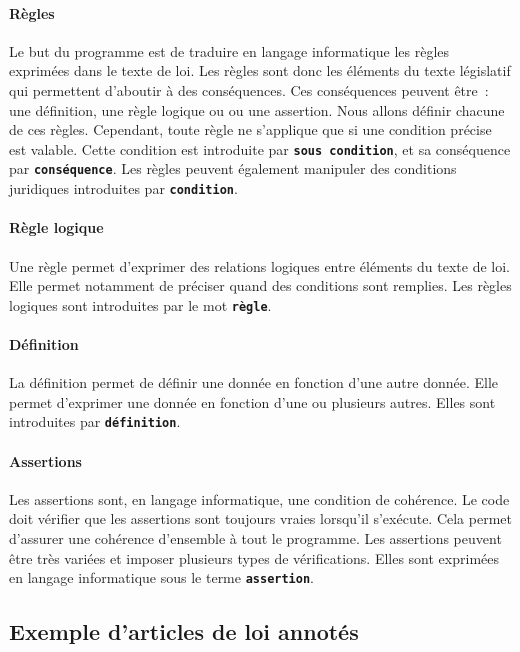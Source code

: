 \documentclass[12pt, french]{article}
\newcommand{\kw}[1]{\textbf{\textcolor{OliveGreen}{#1}}}
\newcommand{\inlinekw}[1]{\kw{\texttt{#1}}}
\begin{document}
\paragraph{Règles} Le but du programme est de traduire en langage informatique les règles exprimées dans le texte de loi. Les règles sont donc les éléments du texte législatif qui permettent d’aboutir à des conséquences. Ces conséquences peuvent être : une définition, une règle logique ou  ou une assertion. Nous allons définir chacune de ces règles. Cependant, toute règle ne s’applique que si une condition précise est valable. Cette condition est introduite par \inlinekw{sous condition}, et sa conséquence par \inlinekw{conséquence}. Les règles peuvent également manipuler des conditions juridiques introduites par \inlinekw{condition}.

\paragraph{Règle logique} Une règle permet d’exprimer des relations logiques entre éléments du texte de loi. Elle permet notamment de préciser quand des conditions sont remplies. Les règles logiques sont introduites par le mot \inlinekw{règle}.

\paragraph{Définition} La définition permet de définir une donnée en fonction d’une autre donnée. Elle permet d’exprimer une donnée en fonction d’une ou plusieurs autres. Elles sont introduites par \inlinekw{définition}.

\paragraph{Assertions} Les assertions sont, en langage informatique, une condition de cohérence. Le code doit vérifier que les assertions sont toujours vraies lorsqu’il s’exécute. Cela permet d’assurer une cohérence d’ensemble à tout le programme. Les assertions peuvent être très variées et imposer plusieurs types de vérifications. Elles sont exprimées en langage informatique sous le terme \inlinekw{assertion}.

\subsection{Exemple d'articles de loi annotés}
\end{document}
